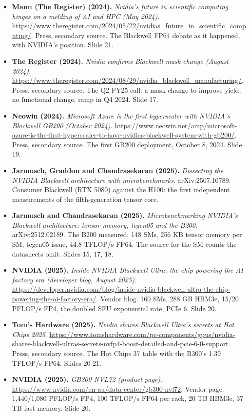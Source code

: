 \documentclass[11pt,letterpaper]{article}
\begin{document}
\begin{itemize}[leftmargin=1.2em,itemsep=3pt]
\item \textbf{Mann (The Register) (2024).} \textit{Nvidia's future in scientific computing hinges on a melding of AI and HPC (May 2024)}. \url{https://www.theregister.com/2024/05/22/nvidias_future_in_scientific_computing/}. Press, secondary source. The Blackwell FP64 debate as it happened, with NVIDIA's position. Slide 21.
\item \textbf{The Register (2024).} \textit{Nvidia confirms Blackwell mask change (August 2024)}. \url{https://www.theregister.com/2024/08/29/nvidia_blackwell_manufacturing/}. Press, secondary source. The Q2 FY25 call: a mask change to improve yield, no functional change, ramp in Q4 2024. Slide 17.
\item \textbf{Neowin (2024).} \textit{Microsoft Azure is the first hyperscaler with NVIDIA's Blackwell GB200 (October 2024)}. \url{https://www.neowin.net/amp/microsoft-azure-is-the-first-hyperscaler-to-have-nvidias-blackwell-system-with-gb200/}. Press, secondary source. The first GB200 deployment, October 8, 2024. Slide 19.
\item \textbf{Jarmusch, Graddon and Chandrasekaran (2025).} \textit{Dissecting the NVIDIA Blackwell architecture with microbenchmarks}. arXiv:2507.10789. Consumer Blackwell (RTX 5080) against the H100: the first independent measurements of the fifth-generation tensor core.
\item \textbf{Jarmusch and Chandrasekaran (2025).} \textit{Microbenchmarking NVIDIA's Blackwell architecture: tensor memory, tcgen05 and the B200}. arXiv:2512.02189. The B200 measured: 148 SMs, 256 KB tensor memory per SM, tcgen05 issue, 44.8 TFLOP/s FP64. The source for the SM counts the datasheets omit. Slides 15, 17, 18.
\item \textbf{NVIDIA (2025).} \textit{Inside NVIDIA Blackwell Ultra: the chip powering the AI factory era (developer blog, August 2025)}. \url{https://developer.nvidia.com/blog/inside-nvidia-blackwell-ultra-the-chip-powering-the-ai-factory-era/}. Vendor blog. 160 SMs, 288 GB HBM3e, 15/20 PFLOP/s FP4, the doubled SFU exponential rate, PCIe 6. Slide 20.
\item \textbf{Tom's Hardware (2025).} \textit{Nvidia shares Blackwell Ultra's secrets at Hot Chips 2025}. \url{https://www.tomshardware.com/pc-components/gpus/nvidia-shares-blackwell-ultras-secrets-nvfp4-boost-detailed-and-pcie-6-0-support}. Press, secondary source. The Hot Chips 37 table with the B300's 1.39 TFLOP/s FP64. Slides 20-21.
\item \textbf{NVIDIA (2025).} \textit{GB300 NVL72 (product page)}. \url{https://www.nvidia.com/en-au/data-center/gb300-nvl72}. Vendor page. 1,440/1,080 PFLOP/s FP4, 100 TFLOP/s FP64 per rack, 20 TB HBM3e, 37 TB fast memory. Slide 20.

\end{itemize}
\end{document}
